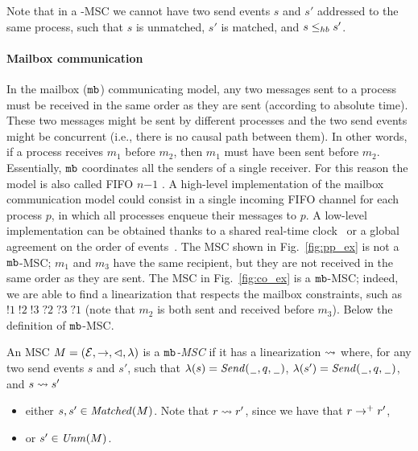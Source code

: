 Note that in a \co-MSC we cannot have two send events $s$ and $s'$ addressed to the same process, such that $s$ is unmatched, $s'$ is matched, and $s \leq_{hb} s'$. 

\paragraph{\bf Mailbox communication}
In the mailbox ($\mathtt{mb}$) communicating model, any two messages sent to a process  must be received in the same order as they are sent (according to absolute time). These two messages might be sent by different processes and the two send events might be concurrent (i.e., there is no causal path between them). In other words, if a process  receives $m_1$ before $m_2$, then $m_1$ must have been sent before $m_2$. Essentially, $\mathtt{mb}$ coordinates all the senders of a single receiver. For this reason the model is also called FIFO $n\mathsf{-}1$ \cite{DBLP:journals/fac/ChevrouHQ16}.   A high-level implementation of the mailbox communication model could consist in a single incoming FIFO channel for each process $p$, in which all processes enqueue their messages to $p$. 
A low-level implementation can be obtained thanks to a shared real-time clock~\cite{cristian1999timed} or a global agreement on the order of events~\cite{defago2004total, raynal2010communication}.
The MSC shown in Fig.~\ref{fig:pp_ex} is not a  $\mathtt{mb}$-MSC; $m_1$ and $m_3$ have the same recipient, but they are not received in the same order as they are sent. The MSC in Fig.~\ref{fig:co_ex} is a $\mathtt{mb}$-MSC; indeed, we are able to find a linearization that respects the mailbox constraints, such as $!1\;!2\;!3\;?2\;?3\;?1$ (note that $m_2$ is both sent and received before $m_3$). Below the definition of $\mathtt{mb}$-MSC.

\begin{definition}\label{def:mb_msc}
	An MSC $M = (\mathcal{E},\to,\lhd,\lambda)$ is a \emph{$\mathtt{mb}$-MSC} if it has a linearization $\rightsquigarrow$ where, for any two send events $s$ and $s'$, such that $\lambda(s)={\mathit{Send}(\hspace{0.1em}\underline{\hspace{0.5em}}\hspace{0.1em},q,\hspace{0.1em}\underline{\hspace{0.5em}}\hspace{0.1em})}$, $\lambda(s')={\mathit{Send}(\hspace{0.1em}\underline{\hspace{0.5em}}\hspace{0.1em},q,\hspace{0.1em}\underline{\hspace{0.5em}}\hspace{0.1em})}$, and $s \rightsquigarrow s'$
	\begin{itemize}%
		\item either $s,s' \in \mathit{Matched}(M)$. Note that $r \rightsquigarrow r'$, since we have that $r \to^+ r'$,
		\item or $s' \in \mathit{Unm}(M)$.
	\end{itemize}
\end{definition}

